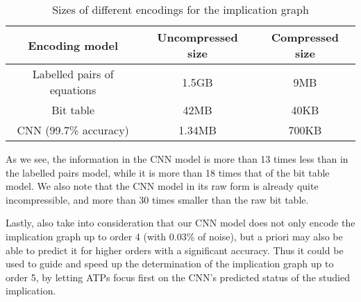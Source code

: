 \begin{table}[h]
\centering
\begin{tabular}{|c|c|c|}
  \hline
  \textbf{Encoding model} & \textbf{Uncompressed size} & \textbf{Compressed size} \\\hline\hline
  Labelled pairs of equations & 1.5GB & 9MB \\\hline
  Bit table & 42MB & 40KB \\\hline
  CNN (99.7\% accuracy) & 1.34MB & 700KB \\
  \hline
\end{tabular}
\caption{Sizes of different encodings for the implication graph}
\end{table}

\smallskip

\noindent As we see, the information in the CNN model is more than 13 times less than in the labelled pairs model, while it is more than 18 times that of the bit table model. We also note that the CNN model in its raw form is already quite incompressible, and more than 30 times smaller than the raw bit table.

\smallskip

Lastly, also take into consideration that our CNN model does not only encode the implication graph up to order 4 (with 0.03\% of noise), but a priori may also be able to predict it for higher orders with a significant accuracy. Thus it could be used to guide and speed up the determination of the implication graph up to order 5, by letting ATPs focus first on the CNN’s predicted status of the studied implication.
